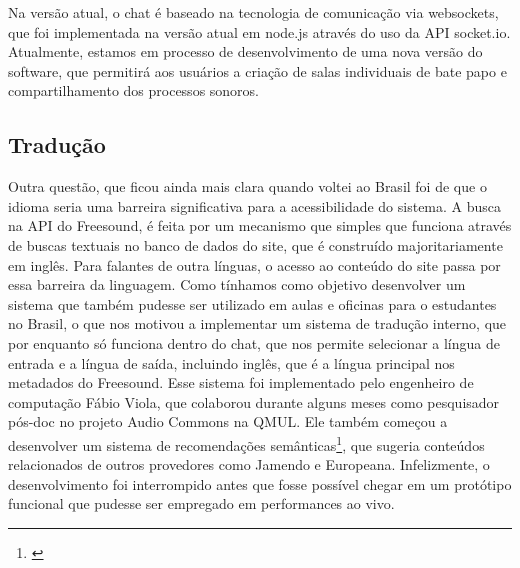Na versão atual, o chat é baseado na tecnologia de comunicação via websockets, que foi implementada na versão atual em node.js através do uso da API socket.io. Atualmente, estamos em processo de desenvolvimento de uma nova versão do software, que permitirá aos usuários a criação de salas individuais de bate papo e compartilhamento dos processos sonoros.








\subsection{Tradução}

Outra questão, que ficou ainda mais clara quando voltei ao Brasil foi de que o idioma seria uma barreira significativa para a acessibilidade do sistema. A busca na API do Freesound, é feita por um mecanismo que simples que funciona através de buscas textuais no banco de dados do site, que é construído majoritariamente em inglês. Para falantes de outra línguas, o acesso ao conteúdo do site passa por essa barreira da linguagem. Como tínhamos como objetivo desenvolver um sistema que também pudesse ser utilizado em aulas e oficinas para o estudantes no Brasil, o que nos motivou a implementar um sistema de tradução interno, que por enquanto só funciona dentro do chat, que nos permite selecionar a língua de entrada e a língua de saída, incluindo inglês, que é a língua principal nos metadados do Freesound. Esse sistema foi implementado pelo engenheiro de computação Fábio Viola, que colaborou durante alguns meses como pesquisador pós-doc no projeto Audio Commons na QMUL. Ele também começou a desenvolver um sistema de recomendações semânticas\footnote{\cite{Viola2018}}, que sugeria conteúdos relacionados de outros provedores como Jamendo e Europeana. Infelizmente, o desenvolvimento foi interrompido antes que fosse possível chegar em um protótipo funcional que pudesse ser empregado em performances ao vivo.

